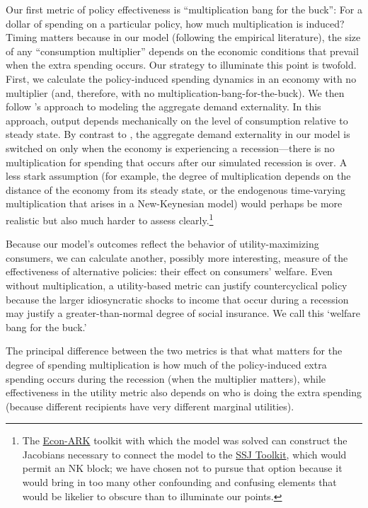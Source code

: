 \documentclass[\econtexRoot/HAFiscal]{subfiles}
\begin{document}
Our first metric of policy effectiveness is ``multiplication bang for the buck'': For a dollar of spending on a particular policy, how much multiplication is induced?  Timing matters because in our model (following the empirical literature), the size of any ``consumption multiplier'' depends on the economic conditions that prevail when the extra spending occurs.  Our strategy to illuminate this point is twofold.  First, we calculate the policy-induced spending dynamics in an economy with no multiplier (and, therefore, with no multiplication-bang-for-the-buck).  We then follow \cite{kmpHandbook2016}'s approach to modeling the aggregate demand externality.  In this approach, output depends mechanically on the level of consumption relative to steady state. By contrast to \cite{kmpHandbook2016}, the aggregate demand externality in our model is switched on only when the economy is experiencing a recession---there is no multiplication for spending that occurs after our simulated recession is over.  A less stark assumption (for example, the degree of multiplication depends on the distance of the economy from its steady state, or the endogenous time-varying multiplication that arises in a New-Keynesian model) would perhaps be more realistic but also much harder to assess clearly.\footnote{The \href{https://econ-ark.org}{Econ-ARK} toolkit with which the model was solved can construct the Jacobians necessary to connect the model to the \href{https://github.com/shade-econ/sequence-jacobian}{SSJ Toolkit}, which would permit an NK block; we have chosen not to pursue that option because it would bring in too many other confounding and confusing elements that would be likelier to obscure than to illuminate our points.}

Because our model's outcomes reflect the behavior of utility-maximizing consumers, we can calculate another, possibly more interesting, measure of the effectiveness of alternative policies:  their effect on consumers' welfare.  Even without multiplication, a utility-based metric can justify countercyclical policy because the larger idiosyncratic shocks to income that occur during a recession may justify a greater-than-normal degree of social insurance.  We call this `welfare bang for the buck.'

The principal difference between the two metrics is that what matters for the degree of spending multiplication is how much of the policy-induced extra spending occurs during the recession (when the multiplier matters), while effectiveness in the utility metric also depends on who is doing the extra spending (because different recipients have very different marginal utilities).
\end{document}
